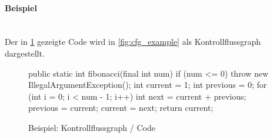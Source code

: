 \documentclass[ngerman,color=3b]{tuda_summary}
\begin{document}
\paragraph{Beispiel}\mbox{}\\
Der in \figurename{} \ref{fig:fibonaccicodecfg} gezeigte Code wird in \figurename{} \ref{fig:cfg_example} als Kontrollflussgraph dargestellt.
\begin{figure}[ht]
    \centering
    \begin{codeBlock}[autogobble]{}
        public static int fibonacci(final int num) {
        	if (num <= 0) {
        		throw new IllegalArgumentException();
        	}
        	int current = 1;
        	int previous = 0;
        	for (int i = 0; i < num - 1; i++) {
        		int next = current + previous;
        		previous = current;
        		current = next;
        	}
        	return current;
        }
	\end{codeBlock}
    \caption{Beispiel: Kontrollflussgraph / Code}
    \label{fig:fibonaccicodecfg}
\end{figure}
\end{document}
